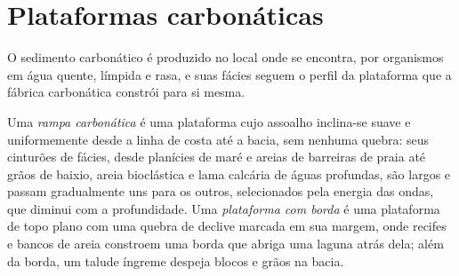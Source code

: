 \begin{omfigure}
\par{}\label{fig:b3:facies-models:deep}
\end{omfigure}

\section{Plataformas carbonáticas}\label{sec:b3:facies-models:carbonates}

O sedimento carbonático é produzido no local onde se encontra, por organismos em água quente, límpida
e rasa, e suas fácies seguem o perfil da plataforma que a
fábrica carbonática constrói para si mesma.

\begin{definition}\label{def:b3:facies-models:ramp}
Uma \emph{rampa carbonática} é uma plataforma cujo assoalho
inclina-se suave e uniformemente desde a linha de costa até a bacia, sem nenhuma quebra:
seus cinturões de fácies, desde planícies de maré e areias de barreiras de praia até grãos de
baixio, areia bioclástica e lama calcária de águas profundas, são largos e passam gradualmente uns
para os outros, selecionados pela energia das ondas, que diminui com a profundidade. Uma \emph{plataforma com
borda} é uma plataforma de topo plano com uma quebra
de declive marcada em sua margem, onde recifes e bancos de areia constroem uma borda que abriga
uma laguna atrás dela; além da borda, um talude íngreme despeja blocos e grãos
na bacia.
\end{definition}

